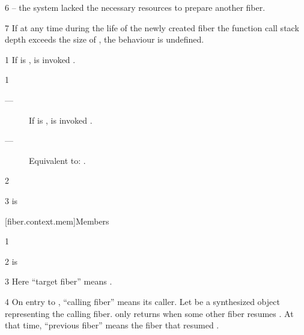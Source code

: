6 \errors
{} -- the system lacked the necessary resources to prepare another fiber.

7 \remarks
If at any time during the life of the newly created fiber the
function call stack depth exceeds the size of , the behaviour is
undefined.


1 \effects
If \emptyfn is \false,  is invoked .



1 \effects
\begin{description}
    \item[---] If \emptyfn is \false,  is invoked .
    \item[---] Equivalent to: .
\end{description}

2 \returns
\this

3 \postcond
\emptyfn[other] is \true

[fiber.context.mem]{Members}

1 \mandates
{}

2 \precond
\canresume is \true

3 Here ``target fiber'' means \thefiber{\state}.

4 On entry to \resumewith, ``calling fiber'' means its caller. Let
 be a synthesized \fiber object representing the calling fiber.
\resumewith only returns when some other fiber resumes . At that
time, ``previous fiber'' means the fiber that resumed .

